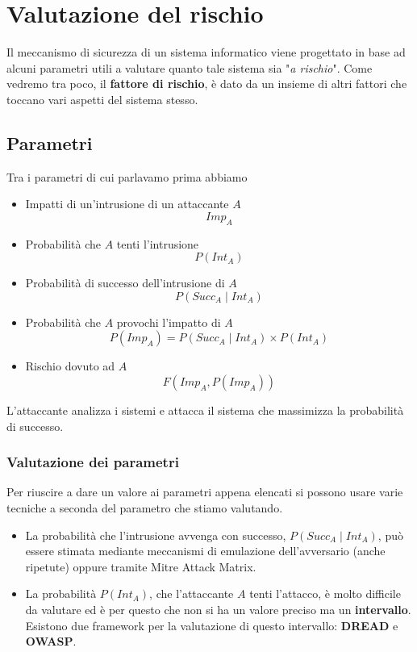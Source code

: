 \chapter{Valutazione del rischio}
Il meccanismo di sicurezza di un sistema informatico viene progettato in base ad alcuni parametri utili a valutare
quanto tale sistema sia "\emph{a rischio}". Come vedremo tra poco, il \textbf{fattore di rischio}, è dato da un
insieme di altri fattori che toccano vari aspetti del sistema stesso.

\section{Parametri}
Tra i parametri di cui parlavamo prima abbiamo
\begin{itemize}
	\item Impatti di un'intrusione di un attaccante $A$ \[ Imp_A \]
	\item Probabilità che $A$ tenti l'intrusione \[ P(Int_A) \]
	\item Probabilità di successo dell'intrusione di $A$ \[ P(Succ_A \mid Int_A) \]
	\item Probabilità che $A$ provochi l'impatto di $A$ \[ P(Imp_A) = P(Succ_A \mid Int_A) \times P(Int_A) \]
	\item Rischio dovuto ad $A$ \[ F(Imp_A, P(Imp_A)) \]
\end{itemize}
L'attaccante analizza i sistemi e attacca il sistema che massimizza la probabilità di successo.

\subsection{Valutazione dei parametri}
Per riuscire a dare un valore ai parametri appena elencati si possono usare varie tecniche a seconda del parametro
che stiamo valutando.
\begin{itemize}
	\item La probabilità che l'intrusione avvenga con successo, $P(Succ_A \mid Int_A)$, può essere stimata mediante
	      meccanismi di emulazione dell'avversario (anche ripetute) oppure tramite Mitre Attack Matrix.
	\item La probabilità $P(Int_A)$, che l'attaccante $A$ tenti l'attacco, è molto difficile da valutare ed è per
	      questo che non si ha un valore preciso ma un \textbf{intervallo}. Esistono due framework per la valutazione
	      di questo intervallo: \textbf{DREAD} e \textbf{OWASP}.
\end{itemize}

